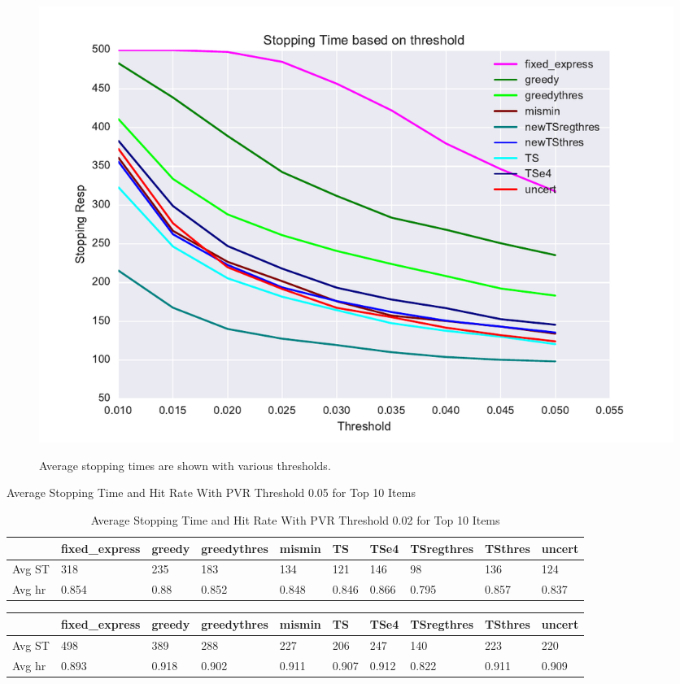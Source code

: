 \documentclass[nonblindrev]{informs3}
\begin{document}
\begin{figure}
\caption{Average stopping times are shown with various thresholds.}
\includegraphics[width=1\textwidth]{plots/stoppingtimes.pdf}
\label{fig:st}
\end{figure}
\begin{table}
\begin{center}
\caption{Average Stopping Time and Hit Rate With PVR Threshold 0.05 for Top 10 Items}
\label{table:st5}
\begin{tabular}{llllllllll}
\hline    &  fixed\_express &  greedy &  greedythres &  mismin &    TS &  TSe4 &  TSregthres &  TSthres &  uncert \\\hline  Avg ST  & 318 &   235 & 183 & 134 & 121 & 146 & 	98 &	136 &   124 \\  Avg hr  &  0.854 &  0.88 & 0.852&0.848 & 0.846 & 	0.866 & 0.795 &0.857 &  0.837 \end{tabular}
\end{center}
\caption{Average Stopping Time and Hit Rate With PVR Threshold 0.02 for Top 10 Items}
\label{table:st2}
\end{table}
\begin{table}
\begin{center}
\begin{tabular}{llllllllll}
\hline    &  fixed\_express &  greedy &  greedythres &  mismin &    TS &  TSe4 &  TSregthres &  TSthres &  uncert \\\hline    Avg ST & 498 & 389 & 288 & 227 & 206 & 247 & 140 &223 &  220 \\ Avg hr & 0.893 &0.918&0.902& 	0.911 & 0.907& 0.912 & 0.822&0.911& 0.909\end{tabular}
\end{center}
\end{table}
\end{document}
